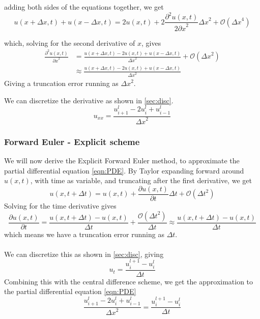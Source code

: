 \documentclass[10pt,a4paper]{article}
\newcommand{\bigO}{{\mathcal{O}}}
\newcommand{\dt}{{\Delta t}}
\newcommand{\dx}{{\Delta x}}
\newcommand{\pt}{{\partial t}}
\newcommand{\px}{{\partial x}}
\newcommand{\pu}{{\partial u}}
\newcommand{\ppu}{{\partial^2 u}}
\begin{document}
adding both sides of the equations together, we get
\begin{equation}
u(x+\Delta x, t) + u(x-\Delta x, t) = 2u(x,t) + 2\frac{\ppu(x,t)}{2\px^2}\dx^2 + \bigO(\dx^4)
\end{equation}

which, solving for the second derivative of $x$, gives
\begin{equation}\begin{split}
\frac{\ppu(x,t)}{\px^2} &= \frac{u(x+\Delta x, t) - 2u(x,t) + u(x-\Delta x, t)}{\dx^2} + \bigO(\dx^2)\\
&\approx \frac{u(x+\Delta x, t) - 2u(x,t) + u(x-\Delta x, t)}{\dx^2}
\end{split}\end{equation}
Giving a truncation error running as $\dx^2$.

We can discretize the derivative as shown in \ref{sec:disc}.
\begin{equation}
u_{xx} = \frac{u_{i+1}^l - 2u_i^l+u_{i-1}^l}{\dx^2}
\end{equation}




\subsubsection{Forward Euler - Explicit scheme}
We will now derive the Explicit Forward Euler method, to approximate the partial differential equation \ref{eqn:PDE}. By Taylor expanding forward around $u(x,t)$, with time as variable, and truncating after the first derivative, we get
\begin{equation}
u(x,t+\dt) = u(x,t) + \frac{\pu(x,t)}{\pt}\dt + \bigO(\dt^2)
\end{equation}
Solving for the time derivative gives
\begin{equation}
\frac{\pu(x,t)}{\pt} = \frac{u(x,t+\dt) - u(x,t)}{\dt} + \frac{\bigO(\dt^2)}{\dt} \approx \frac{u(x,t+\dt) - u(x,t)}{\dt}
\end{equation}
which means we have a truncation error running as $\dt$.
\\\\
We can discretize this as shown in \ref{sec:disc}, giving
\begin{equation}
u_t = \frac{u_i^{l+1} - u_i^l}{\dt}
\end{equation}
Combining this with the central difference scheme, we get the approximation to the partial differential equation \vref{eqn:PDE}
\begin{equation}
\frac{u_{i+1}^l - 2u_i^l+u_{i-1}^l}{\dx^2} = \frac{u_i^{l+1} - u_i^l}{\dt}
\end{equation}
\end{document}
